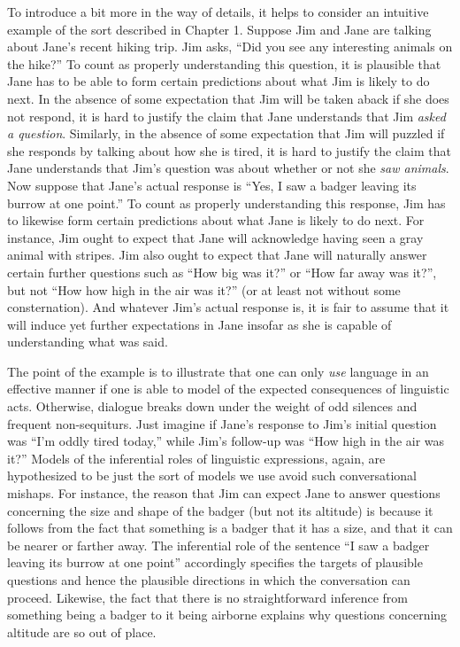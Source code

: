To introduce a bit more in the way of details, it helps to consider an intuitive example of the sort described in Chapter 1. Suppose Jim and Jane are talking about Jane's recent hiking trip. Jim asks, ``Did you see any interesting animals on the hike?'' To count as properly understanding this question, it is plausible that Jane has to be able to form certain predictions about what Jim is likely to do next. In the absence of some expectation that Jim will be taken aback if she does not respond, it is hard to justify the claim that Jane understands that Jim \textit{asked a question}. Similarly, in the absence of some expectation that Jim will puzzled if she responds by talking about how she is tired, it is hard to justify the claim that Jane understands that Jim's question was about whether or not she \textit{saw animals}. Now suppose that Jane's actual response is ``Yes, I saw a badger leaving its burrow at one point.'' To count as properly understanding this response, Jim has to likewise form certain predictions about what Jane is likely to do next. For instance, Jim ought to expect that Jane will acknowledge having seen a gray animal with stripes. Jim also ought to expect that Jane will naturally answer certain further questions such as ``How big was it?'' or ``How far away was it?'', but not ``How how high in the air was it?'' (or at least not without some consternation). And whatever Jim's actual response is, it is fair to assume that it will induce yet further expectations in Jane insofar as she is capable of understanding what was said. 

The point of the example is to illustrate that one can only \textit{use} language in an effective manner if one is able to model of the expected consequences of linguistic acts. Otherwise, dialogue breaks down under the weight of odd silences and frequent non-sequiturs. Just imagine if Jane's response to Jim's initial question was ``I'm oddly tired today,'' while Jim's follow-up was ``How high in the air was it?'' Models of the inferential roles of linguistic expressions, again, are hypothesized to be just the sort of models we use avoid such conversational mishaps. For instance, the reason that Jim can expect Jane to answer questions concerning the size and shape of the badger (but not its altitude) is because it follows from the fact that something is a badger that it has a size, and that it can be nearer or farther away. The inferential role of the sentence ``I saw a badger leaving its burrow at one point'' accordingly specifies the targets of plausible questions and hence the plausible directions in which the conversation can proceed. Likewise, the fact that there is no straightforward inference from something being a badger to it being airborne explains why questions concerning altitude are so out of place.

